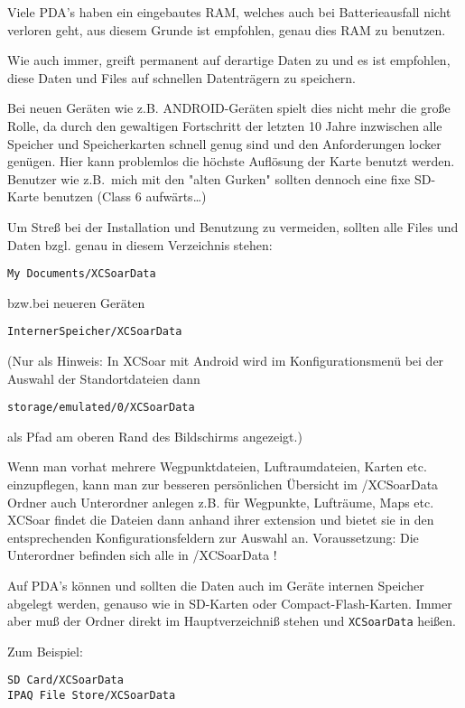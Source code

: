 Viele PDA's haben ein eingebautes RAM, welches auch bei Batterieausfall nicht verloren geht, aus diesem
Grunde ist empfohlen, genau dies RAM zu benutzen.

Wie auch immer, \xc greift permanent auf derartige Daten zu und es ist empfohlen, diese Daten und
Files auf schnellen Datenträgern zu speichern.

Bei neuen Geräten wie z.B. ANDROID-Geräten spielt dies nicht mehr die große Rolle, da durch den
gewaltigen Fortschritt der letzten 10 Jahre inzwischen alle Speicher und Speicherkarten schnell genug sind und den Anforderungen locker genügen. Hier kann problemlos die höchste Auflösung der Karte benutzt werden.
Benutzer wie z.B.\ mich mit den "alten Gurken" sollten dennoch eine fixe SD-Karte benutzen (Class 6
aufwärts\dots)


Um Streß bei der Installation und Benutzung zu vermeiden, sollten alle Files und Daten bzgl. \xc  genau in
diesem Verzeichnis stehen:

\begin{verbatim}
My Documents/XCSoarData
\end{verbatim}

bzw.bei neueren Geräten

\begin{verbatim}
InternerSpeicher/XCSoarData
\end{verbatim}

(Nur als Hinweis: In XCSoar mit Android wird im Konfigurationsmenü bei der Auswahl der Standortdateien dann
\begin{verbatim}
storage/emulated/0/XCSoarData 
\end{verbatim} 
als Pfad am oberen Rand des Bildschirms angezeigt.)

Wenn man vorhat mehrere Wegpunktdateien, Luftraumdateien, Karten etc. einzupflegen, kann man zur besseren persönlichen Übersicht im /XCSoarData Ordner auch Unterordner anlegen z.B. für Wegpunkte, Lufträume, Maps etc. 
XCSoar findet die Dateien dann anhand ihrer extension und bietet sie in den entsprechenden Konfigurationsfeldern zur Auswahl an. Voraussetzung: Die Unterordner befinden sich alle in /XCSoarData !


Auf PDA's können und sollten die Daten auch im Geräte internen Speicher abgelegt werden, genauso wie in
SD-Karten oder Compact-Flash-Karten. Immer aber muß der Ordner direkt im Hauptverzeichniß stehen und
\verb|XCSoarData| heißen.

Zum Beispiel:
\begin{verbatim}
SD Card/XCSoarData
IPAQ File Store/XCSoarData
\end{verbatim}

